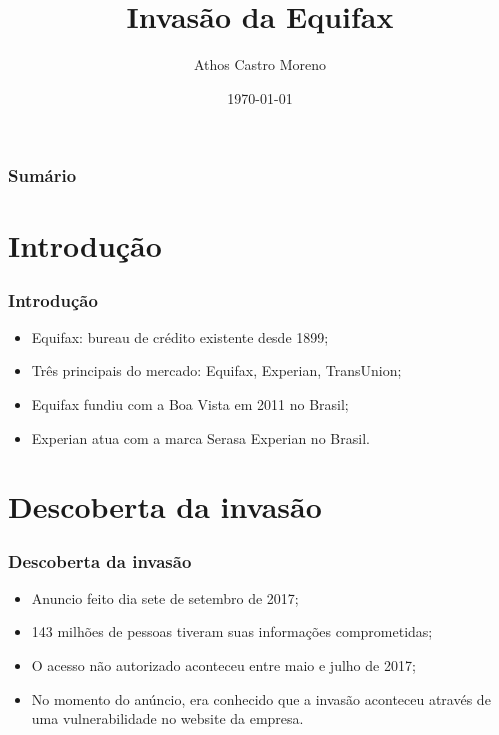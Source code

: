 \documentclass{beamer}
\title{Invasão da Equifax}
\author[Athos Castro Moreno]{Athos Castro Moreno}
\institute{Universidade Tecnológica Federal do Paraná}
\date{\today}
\begin{document}
	\begin{frame}
		\titlepage
	\end{frame}
	\begin{frame}
		\frametitle{Sumário}
		\tableofcontents
	\end{frame}
	\section{Introdução}
	\begin{frame}
		\frametitle{Introdução}
		\begin{itemize}
			\item Equifax: bureau de crédito existente desde 1899;
			\item Três principais do mercado: Equifax, Experian, TransUnion;
			\item Equifax fundiu com a Boa Vista em 2011 no Brasil;
			\item Experian atua com a marca Serasa Experian no Brasil. 
		\end{itemize}
	\end{frame}
	\section{Descoberta da invasão}
	\begin{frame}
		\frametitle{Descoberta da invasão}
		\begin{itemize}
			\item Anuncio feito dia sete de setembro de 2017;
			\item 143 milhões de pessoas tiveram suas informações comprometidas;
			\item O acesso não autorizado aconteceu entre maio e julho de 2017;
			\item No momento do anúncio, era conhecido que a invasão aconteceu através de uma vulnerabilidade no website da empresa.
		\end{itemize}
	\end{frame}
\end{document}
